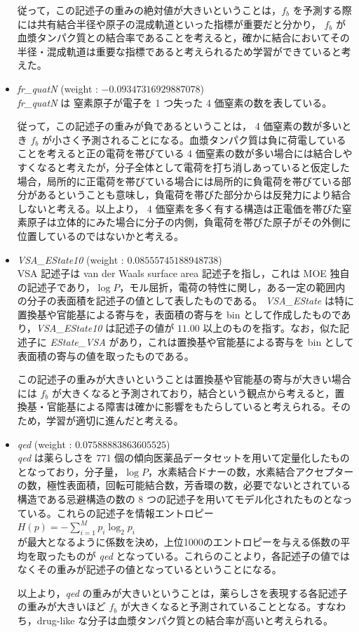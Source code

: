 \documentclass[a4j,11pt]{jarticle}
\begin{document}
\begin{itemize}
 従って，この記述子の重みの絶対値が大きいということは，$f_b$ を予測する際には共有結合半径や原子の混成軌道といった指標が重要だと分かり， $f_b$ が血漿タンパク質との結合率であることを考えると，確かに結合においてその半径・混成軌道は重要な指標であると考えられるため学習ができていると考えた。
\item  \textit{fr\_quatN} (weight : $-0.09347316929887078$) \\
 \textit{fr\_quatN} は 窒素原子が電子を 1 つ失った 4 価窒素の数を表している。\cite{fr}\par
 従って，この記述子の重みが負であるということは， 4 価窒素の数が多いとき $f_b$ が小さく予測されることになる。血漿タンパク質は負に荷電している\cite{plusma}ことを考えると正の電荷を帯びている 4 価窒素の数が多い場合には結合しやすくなると考えたが，分子全体として電荷を打ち消しあっていると仮定した場合，局所的に正電荷を帯びている場合には局所的に負電荷を帯びている部分があるということも意味し，負電荷を帯びた部分からは反発力により結合しないと考える。以上より， 4 価窒素を多く有する構造は正電価を帯びた窒素原子は立体的にみた場合に分子の内側，負電荷を帯びた原子がその外側に位置しているのではないかと考える。
\item  \textit{VSA\_EState10} (weight : $0.08555745188948738$) \\
 VSA 記述子は van der Waals surface area 記述子を指し，これは MOE 独自の記述子であり，$\log{P}$，モル屈折，電荷の特性に関し，ある一定の範囲内の分子の表面積を記述子の値として表したものである。\cite{moa_vsa} \textit{VSA\_EState} は特に置換基や官能基による寄与を，表面積の寄与を bin として作成したものであり，\textit{VSA\_EState10} は記述子の値が $11.00$ 以上のものを指す。\cite{estate_vsa}なお，似た記述子に \textit{EState\_VSA} があり，これは置換基や官能基による寄与を bin として表面積の寄与の値を取ったものである。\par
 この記述子の重みが大きいということは置換基や官能基の寄与が大きい場合には $f_b$ が大きくなると予測されており，結合という観点から考えると，置換基・官能基による障害は確かに影響をもたらしていると考えられる。そのため，学習が適切に進んだと考える。
\item  \textit{qed} (weight : $0.07588883863605525$) \\
 \textit{qed} は薬らしさを 771 個の傾向医薬品データセットを用いて定量化したものとなっており，分子量，$\log{P}$，水素結合ドナーの数，水素結合アクセプターの数，極性表面積，回転可能結合数，芳香環の数，必要でないとされている構造である忌避構造の数の 8 つの記述子を用いてモデル化されたものとなっている。これらの記述子を情報エントロピー\\
 \linebreak
 $H(p) = -\sum_{i=1}^{M}p_i\log_2{p_i}$ \\
 \linebreak
 が最大となるように係数を決め，上位1000のエントロピーを与える係数の平均を取ったものが \textit{qed} となっている。\cite{qed}これらのことより，各記述子の値ではなくその重みが記述子の値となっているということになる。\par
以上より，\textit{qed} の重みが大きいということは，薬らしさを表現する各記述子の重みが大きいほど $f_b$ が大きくなると予測されていることとなる。すなわち，drug-like な分子は血漿タンパク質との結合率が高いと考えられる。
\end{itemize}
\end{document}

